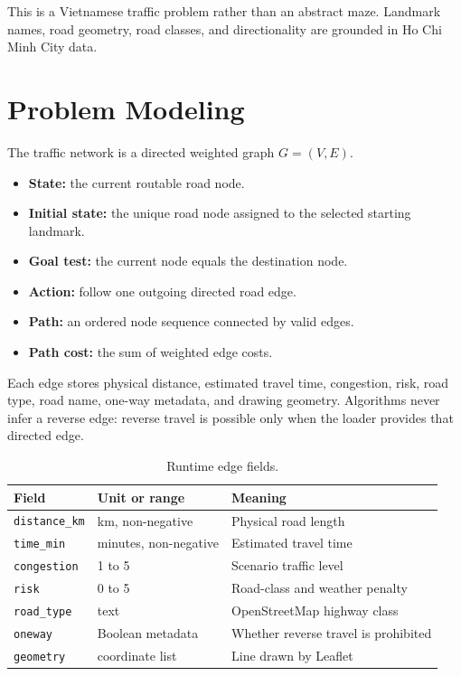 \documentclass[12pt,a4paper]{article}
\begin{document}
This is a Vietnamese traffic problem rather than an abstract maze. Landmark
names, road geometry, road classes, and directionality are grounded in Ho Chi
Minh City data.

\section{Problem Modeling}

The traffic network is a directed weighted graph $G=(V,E)$.

\begin{itemize}
    \item \textbf{State:} the current routable road node.
    \item \textbf{Initial state:} the unique road node assigned to the selected
          starting landmark.
    \item \textbf{Goal test:} the current node equals the destination node.
    \item \textbf{Action:} follow one outgoing directed road edge.
    \item \textbf{Path:} an ordered node sequence connected by valid edges.
    \item \textbf{Path cost:} the sum of weighted edge costs.
\end{itemize}

Each edge stores physical distance, estimated travel time, congestion, risk,
road type, road name, one-way metadata, and drawing geometry. Algorithms never
infer a reverse edge: reverse travel is possible only when the loader provides
that directed edge.

\begin{table}[H]
    \centering
    \caption{Runtime edge fields.}
    \label{tab:edge-fields}
    \renewcommand{\arraystretch}{1.15}
    \small
    \begin{tabularx}{\textwidth}{P{3.2cm} P{3.2cm} Y}
        \toprule
        \textbf{Field} & \textbf{Unit or range} & \textbf{Meaning} \\
        \midrule
        \texttt{distance\_km} & km, non-negative & Physical road length \\
        \texttt{time\_min} & minutes, non-negative & Estimated travel time \\
        \texttt{congestion} & 1 to 5 & Scenario traffic level \\
        \texttt{risk} & 0 to 5 & Road-class and weather penalty \\
        \texttt{road\_type} & text & OpenStreetMap highway class \\
        \texttt{oneway} & Boolean metadata & Whether reverse travel is prohibited \\
        \texttt{geometry} & coordinate list & Line drawn by Leaflet \\
        \bottomrule
    \end{tabularx}
\end{table}
\end{document}

